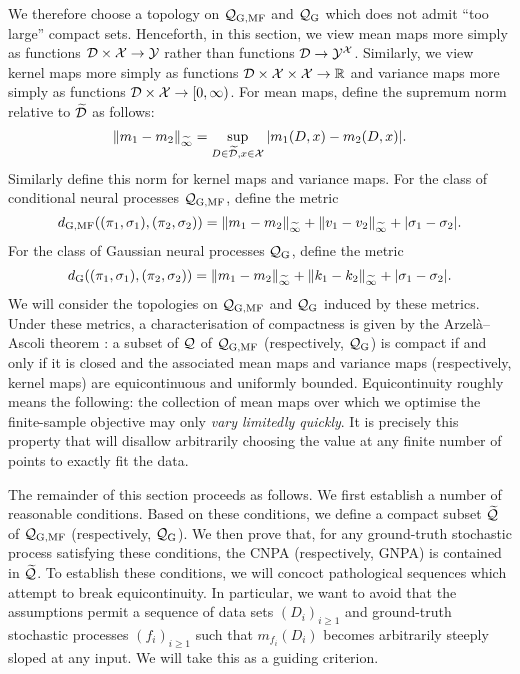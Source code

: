 \documentclass[12pt, twoside]{report}
\begin{document}
We therefore choose a topology on $\Qc\ss{G,MF}$ and $\Qc\ss{G}$ which does not admit ``too large'' compact sets.
Henceforth, in this section, we view mean maps more simply as functions $\mathcal{D} \times \mathcal{X} \to \mathcal{Y}$ rather than functions $\mathcal{D} \to \mathcal{Y}^{\mathcal{X}}$.
Similarly, we view kernel maps more simply as functions $\mathcal{D} \times \mathcal{X} \times \mathcal{X} \to \mathbb{R}$ and variance maps more simply as functions $\mathcal{D} \times \mathcal{X} \to [0, \infty)$.
For mean maps, define the supremum norm relative to $\widetilde{\mathcal{D}}$ as follows:%
\begin{equation}
    \lVert m_1 - m_2\rVert_{\widetilde\infty} = \operatorname*{sup}_{D \in \widetilde{\mathcal{D}}, x \in \mathcal{X}}\,\lvert m_{1}(D, x) - m_{2}(D, x)\rvert.
\end{equation}
Similarly define this norm for kernel maps and variance maps.
For the class of conditional neural processes $\Qc\ss{G,MF}$, define the metric
\begin{equation} \label{eq:metric_Q_G_MF}
    d\ss{G,MF}((\pi_1, \sigma_1), (\pi_2, \sigma_2))
    = \norm{m_{1} - m_{2}}_{\widetilde\infty}
    + \norm{v_{1} - v_{2}}_{\widetilde\infty}
    + \abs{\sigma_1 - \sigma_2}.
\end{equation}
For the class of Gaussian neural processes $\Qc\ss{G}$, define the metric
\begin{equation} \label{eq:metric_Q_G}
    d\ss{G}((\pi_1, \sigma_1), (\pi_2, \sigma_2))
    = \norm{m_{1} - m_{2}}_{\widetilde\infty}
    + \norm{k_{1} - k_{2}}_{\widetilde\infty}
    + \abs{\sigma_1 - \sigma_2}.
\end{equation}
We will consider the topologies on $\Qc\ss{G,MF}$ and $\Qc\ss{G}$ induced by these metrics.
Under these metrics, a characterisation of compactness is given by the Arzel\`a--Ascoli theorem \parencite[Theorem 7.25;][]{Rudin:1976:Principles_of_Mathematical_Analysis}:
 a subset of $\mathcal{Q}$ of $\Qc\ss{G,MF}$ (respectively, $\Qc\ss{G}$) is compact if and only if it is closed and the associated mean maps and variance maps (respectively, kernel maps) are equicontinuous and uniformly bounded. 
Equicontinuity roughly means the following:
the collection of mean maps over which we optimise the finite-sample objective may only \emph{vary limitedly quickly}.
It is precisely this property that will disallow arbitrarily choosing the value at any finite number of points to exactly fit the data.

The remainder of this section proceeds as follows.
We first establish a number of reasonable conditions.
Based on these conditions, we define a compact subset $\widetilde{\mathcal{Q}}$ of $\Qc\ss{G,MF}$ (respectively, $\Qc\ss{G}$).
We then prove that, for any ground-truth stochastic process satisfying these conditions, the CNPA (respectively, GNPA) is contained in $\widetilde{\mathcal{Q}}$.
To establish these conditions, we will concoct pathological sequences which attempt to break equicontinuity.
In particular,
we want to avoid that the assumptions permit a sequence of data sets $(D_i)_{i \ge 1}$ and ground-truth stochastic processes $(f_i)_{i \ge 1}$ such that $m_{f_i}(D_i)$ becomes arbitrarily steeply sloped at any input.
We will take this as a guiding criterion. 
\end{document}
